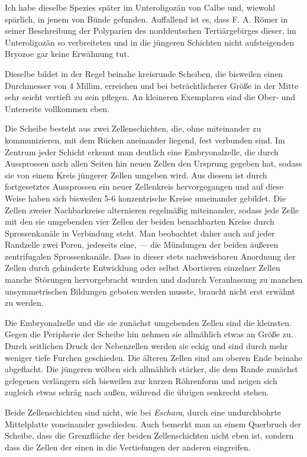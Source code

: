 \documentclass[a4paper, 11pt, oneside, german]{article}
\begin{document}
Ich habe dieselbe Spezies später im Unteroligozän von Calbe und, wiewohl spärlich, in jenem von Bünde gefunden. Auffallend ist es, dass F. A. Römer in seiner Beschreibung der Polyparien des norddeutschen Tertiärgebirges dieser, im Unteroligozän so verbreiteten und in die jüngeren Schichten nicht aufsteigenden Bryozoe gar keine Erwähnung tut.

Dieselbe bildet in der Regel beinahe kreisrunde Scheiben, die bisweilen einen Durchmesser von 4 Millim. erreichen und bei beträchtlicherer Größe in der Mitte sehr seicht vertieft zu sein pflegen. An kleineren Exemplaren sind die Ober- und Unterseite vollkommen eben.

Die Scheibe besteht aus zwei Zellenschichten, die, ohne miteinander zu kommunizieren, mit dem Rücken aneinander liegend, fest verbunden sind. Im Zentrum jeder Schicht erkennt man deutlich eine Embryonalzelle, die durch Aussprossen nach allen Seiten hin neuen Zellen den Ursprung gegeben hat, sodass sie von einem Kreis jüngerer Zellen umgeben wird. Aus diesem ist durch fortgesetztes Aussprossen ein neuer Zellenkreis hervorgegangen und auf diese Weise haben sich bisweilen 5-6 konzentrische Kreise umeinander gebildet. Die Zellen zweier Nachbarkreise alternieren regelmäßig miteinander, sodass jede Zelle mit den sie umgebenden vier Zellen der beiden benachbarten Kreise durch Sprossenkanäle in Verbindung steht. Man beobachtet daher auch auf jeder Randzelle zwei Poren, jedeseits eine, --- die Mündungen der beiden äußeren zentrifugalen Sprossenkanäle. Dass in dieser stets nachweisbaren Anordnung der Zellen durch gehinderte Entwicklung oder selbst Abortieren einzelner Zellen manche Störungen hervorgebracht wurden und dadurch Veranlassung zu manchen unsymmetrischen Bildungen geboten werden musste, braucht nicht erst erwähnt zu werden.

Die Embryonalzelle und die sie zunächst umgebenden Zellen sind die kleinsten. Gegen die Peripherie der Scheibe hin nehmen sie allmählich etwas an Größe zu. Durch seitlichen Druck der Nebenzellen werden sie eckig und sind durch mehr weniger tiefe Furchen geschieden. Die älteren Zellen sind am oberen Ende beinahe abgeflacht. Die jüngeren wölben sich allmählich stärker, die dem Rande zunächst gelegenen verlängern sich bisweilen zur kurzen Röhrenform und neigen sich zugleich etwas schräg nach außen, während die übrigen senkrecht stehen.

Beide Zellenschichten sind nicht, wie bei \emph{Eschara}, durch eine undurchbohrte Mittelplatte voneinander geschieden. Auch bemerkt man an einem Querbruch der Scheibe, dass die Grenzfläche der beiden Zellenschichten nicht eben ist, sondern dass die Zellen der einen in die Vertiefungen der anderen eingreifen.
\end{document}
